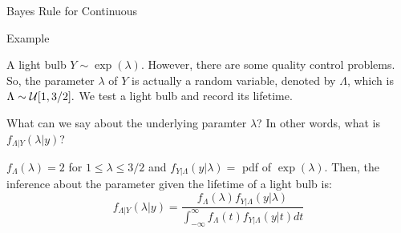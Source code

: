 \begin{frame}{Bayes Rule for Continuous}

\plitemsep 0.1in


 \medskip
 {
}
{

}

\end{frame}



\begin{frame}{Example}

\plitemsep 0.1in

\bci
\item<1-> A light bulb $Y \sim \exp(\lambda).$ However, there are some quality control problems.
So, the parameter $\lambda$ of $Y$ is actually a random variable, denoted by $\Lambda$, which is $\Lambda \sim \mathcal U[1,3/2].$ We test a light bulb and record its lifetime.

\item<2-> \question What can we say about the underlying paramter $\lambda$? In other words, what is $f_{\Lambda | Y}(\lambda|y)$?

\item<3-> $f_{\Lambda}(\lambda) = 2$ for $1 \le \lambda \le 3/2$ and $f_{Y | \Lambda}  (y | \lambda) = $ pdf of $\exp(\lambda).$ Then, the inference about the parameter given the lifetime of a light bulb is:
{
$$
f_{\Lambda | Y}(\lambda|y) = \frac{f_\Lambda(\lambda)f_{Y | \Lambda}  (y | \lambda) }{\int_{-\infty}^\infty f_\Lambda(t) f_{Y | \Lambda}(y | t) dt}
$$
}
\eci

\end{frame}

